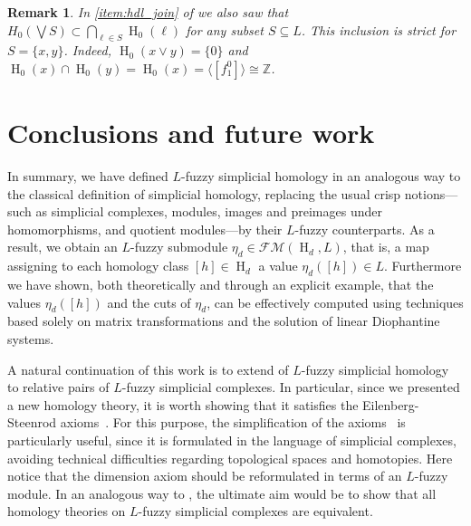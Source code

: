 \documentclass[a4paper,10pt]{article}
\newtheorem{remark}[theorem]{Remark}
\newcommand{\bbz}{\mathbb{Z}}
\newcommand{\calfm}{\mathcal{F\!M}}
\DeclareMathOperator{\Ho}{H}
\begin{document}
\begin{remark}
\label{rem:counterexample2}
In \cref{item:hdl_join} of  we also saw that \(H_0(\bigvee S) \subset \bigcap_{\ell \in S} \Ho_0(\ell)\) for any subset \(S \subseteq L\). 
This inclusion is strict for \(S=\{x, y\}\). Indeed, \(\Ho_0(x \vee y) =\{0\}\) and \(\Ho_0(x) \cap \Ho_0(y) = \Ho_0(x)= \langle [f^0_1]\rangle\cong \bbz\).
\end{remark}


\section{Conclusions and future work}
\label{sec:conclusions}

In summary, we have defined $L$-fuzzy simplicial homology in an analogous way to
the classical definition of simplicial homology, replacing the usual crisp notions—such as simplicial complexes, modules, images and preimages under homomorphisms, and quotient modules—by their \(L\)-fuzzy counterparts. As a result, we obtain an \(L\)-fuzzy submodule \(\eta_d \in \calfm(\Ho_d,L)\), that is, a map assigning to each homology class \([h] \in \Ho_d\) a value \(\eta_d([h]) \in L\). Furthermore we have shown, both theoretically and through an explicit example, that the values \(\eta_d([h])\) and the cuts of \(\eta_d\), can be effectively computed using techniques based solely on matrix transformations and the solution of linear Diophantine systems.

A natural continuation of this work is to extend  of $L$-fuzzy simplicial homology to relative pairs of $L$-fuzzy simplicial complexes. 
In particular, since we presented a new homology theory, it is worth showing that it satisfies the Eilenberg-Steenrod axioms~\cite{EilenbergSteenrod1952}. 
For this purpose, the simplification of the axioms~\cite{Dawson1988} is particularly useful, since it is formulated in the language of simplicial complexes, avoiding technical difficulties regarding topological spaces and homotopies. 
Here notice that the dimension axiom should be reformulated in terms of an $L$-fuzzy module.
In an analogous way to \cite{EilenbergSteenrod1952,Dawson1988}, the ultimate aim would be to show that all homology theories on $L$-fuzzy simplicial complexes are equivalent.
\end{document}
